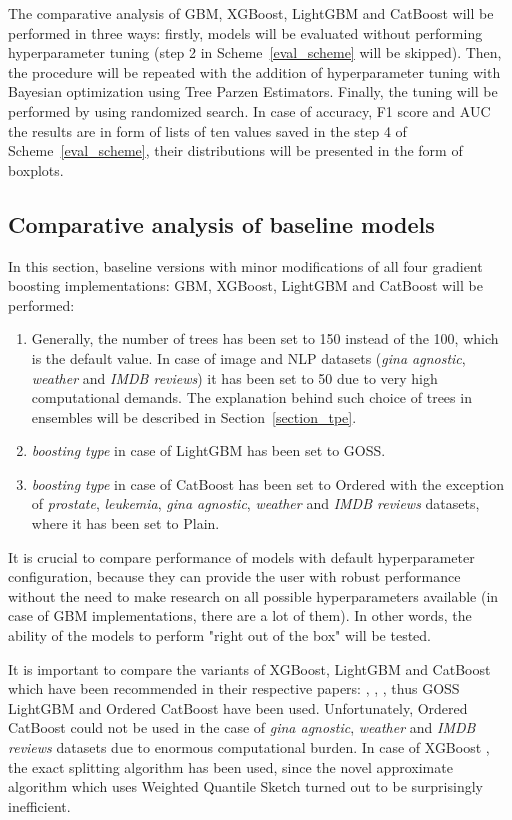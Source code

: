 \documentclass[magisterska, english]{pwr_wmat_praca_dyplomowa}
\theoremstyle{plain}
\numberwithin{theorem}{chapter}
\theoremstyle{definition}
\numberwithin{theorem}{chapter}
\begin{document}
The comparative analysis of GBM, XGBoost, LightGBM and CatBoost will be performed in three ways: firstly, models will be evaluated without performing hyperparameter tuning (step 2 in Scheme~\ref{eval_scheme} will be skipped). Then, the procedure will be repeated with the addition of hyperparameter tuning with Bayesian optimization using Tree Parzen Estimators. Finally, the tuning will be performed by using randomized search. In case of accuracy, F1 score and AUC the results are in form of lists of ten values saved in the step 4 of Scheme~\ref{eval_scheme}, their distributions will be presented in the form of boxplots.

\subsection{Comparative analysis of baseline models}\label{section:baseline}
In this section, baseline versions with minor modifications of all four gradient boosting implementations: GBM, XGBoost, LightGBM and CatBoost will be performed:
\begin{enumerate}
    \item Generally, the number of trees has been set to 150 instead of the 100, which is the default value. In case of image and NLP datasets (\emph{gina agnostic}, \emph{weather} and \emph{IMDB reviews}) it has been set to 50 due to very high computational demands. The explanation behind such choice of trees in ensembles will be described in Section~\ref{section_tpe}.
    \item \emph{boosting type} in case of LightGBM has been set to GOSS.
    \item \emph{boosting type} in case of CatBoost has been set to Ordered with the exception of \emph{prostate}, \emph{leukemia}, \emph{gina agnostic}, \emph{weather} and \emph{IMDB reviews} datasets, where it has been set to Plain.
\end{enumerate}

It is crucial to compare performance of models with default hyperparameter configuration, because they can provide the user with robust performance without the need to make research on all possible hyperparameters available (in case of GBM implementations, there are a lot of them). In other words, the ability of the models to perform "right out of the box" will be tested.

It is important to compare the variants of XGBoost, LightGBM and CatBoost which have been recommended in their respective papers: \cite{xgboost}, \cite{lightgbm}, \cite{catboost}, thus GOSS LightGBM and Ordered CatBoost have been used. Unfortunately, Ordered CatBoost could not be used in the case of \emph{gina agnostic}, \emph{weather} and \emph{IMDB reviews} datasets due to enormous computational burden. In case of XGBoost \cite{xgboost}, the exact splitting algorithm has been used, since the novel approximate algorithm which uses Weighted Quantile Sketch turned out to be surprisingly inefficient.
\end{document}
